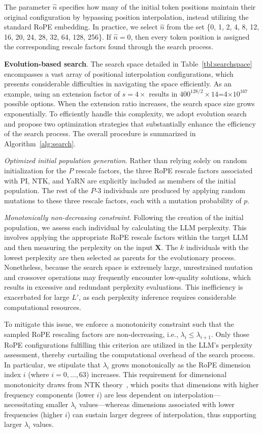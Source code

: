 The parameter $\hat{n}$ specifies how many of the initial token positions maintain their original configuration by bypassing position interpolation, instead utilizing the standard RoPE embedding. In practice, we select $\hat{n}$ from the set \{0, 1, 2, 4, 8, 12, 16, 20, 24, 28, 32, 64, 128, 256\}. If $\hat{n}=0$, then every token position is assigned the corresponding rescale factors found through the search process.

\textbf{Evolution-based search}. The search space detailed in Table~\ref{tbl:searchspace} encompasses a vast array of positional interpolation configurations, which presents considerable difficulties in navigating the space efficiently. As an example, using an extension factor of $s=4\times$ results in $400^{128/2}\times14$=4$\times10^{167}$ possible options. When the extension ratio increases, the search space size grows exponentially. To efficiently handle this complexity, we adopt evolution search~\cite{guo2020single} and propose two optimization strategies that substantially enhance the efficiency of the search process. The overall procedure is summarized in Algorithm~\ref{alg:search}.

\textit{Optimized initial population generation}. Rather than relying solely on random initialization for the $P$ rescale factors, the three RoPE rescale factors associated with PI, NTK, and YaRN are explicitly included as members of the initial population. The rest of the $P$-3 individuals are produced by applying random mutations to these three rescale factors, each with a mutation probability of $p$.

\textit{Monotonically non-decreasing constraint}. Following the creation of the initial population, we assess each individual by calculating the LLM perplexity. This involves applying the appropriate RoPE rescale factors within the target LLM and then measuring the perplexity on the input $\mathbf{X}$. The $k$ individuals with the lowest perplexity are then selected as parents for the evolutionary process. Nonetheless, because the search space is extremely large, unrestrained mutation and crossover operations may frequently encounter low-quality solutions, which results in excessive and redundant perplexity evaluations. This inefficiency is exacerbated for large $L'$, as each perplexity inference requires considerable computational resources.

To mitigate this issue, we enforce a monotonicity constraint such that the sampled RoPE rescaling factors are non-decreasing, i.e., $\lambda_i \le \lambda_{i+1}$. Only those RoPE configurations fulfilling this criterion are utilized in the LLM’s perplexity assessment, thereby curtailing the computational overhead of the search process. In particular, we stipulate that $\lambda_i$ grows monotonically as the RoPE dimension index $i$ (where $i=0,\ldots,63$) increases. This requirement for dimensional monotonicity draws from NTK theory~\cite{jacot2018neural,tancik2020fourier,ntk}, which posits that dimensions with higher frequency components (lower $i$) are less dependent on interpolation—necessitating smaller $\lambda_i$ values—whereas dimensions associated with lower frequencies (higher $i$) can sustain larger degrees of interpolation, thus supporting larger $\lambda_i$ values.

